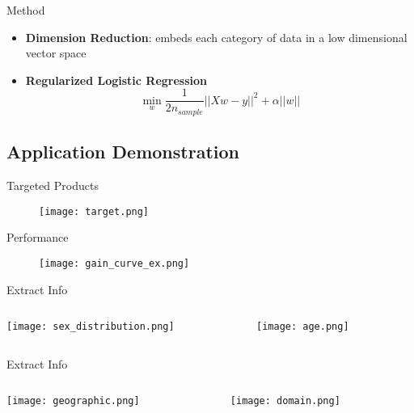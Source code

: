 \documentclass[pdf]{beamer}
\begin{document}
\begin{frame}{Method}
\begin{itemize}
\item{\textbf{Dimension Reduction}: embeds each category of data in a low dimensional vector space}
\item{\textbf{Regularized Logistic Regression}}
\begin{equation*}
\min_{w}\dfrac{1}{2n_{sample}}||Xw - y||^2 + \alpha ||w||
\end{equation*}
\end{itemize}

\end{frame}

\subsection{Application Demonstration}

\begin{frame}{Targeted Products}
\begin{figure}
 \texttt{[image: target.png]}
\end{figure}
\end{frame}

\begin{frame}{Performance}
\begin{figure}
 \texttt{[image: gain\_curve\_ex.png]}
\end{figure}
\end{frame}

\begin{frame}{Extract Info}
     \begin{columns}[T] %
     \begin{column}[T]{5cm} %
     \texttt{[image: sex\_distribution.png]}
     \end{column}
          \begin{column}[T]{5cm} %
     \texttt{[image: age.png]}
    	\end{column}
     \end{columns}
\end{frame}

\begin{frame}{Extract Info}
     \begin{columns}[T] %
     \begin{column}[T]{5cm} %
     \texttt{[image: geographic.png]}
     \end{column}
          \begin{column}[T]{5cm} %
     \texttt{[image: domain.png]}
    	\end{column}
     \end{columns}
\end{frame}
\end{document}
